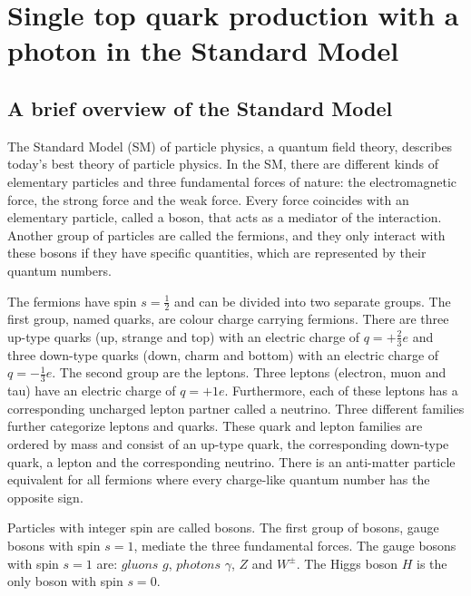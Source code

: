 
\chapter{Single top quark production with a photon in the Standard Model}
\label{chap:tqgamma_production}
\section{A brief overview of the Standard Model}

The Standard Model (SM) of particle physics, a quantum field theory,  describes today's best theory of particle physics. 
In the SM, there are different kinds of elementary particles and three fundamental forces of nature: the electromagnetic force, the strong force and the weak force. 
Every force coincides with an elementary particle, called a boson, that acts as a mediator of the interaction. Another group of particles are called the fermions, and they only interact with these bosons if they have specific quantities, which are represented by their quantum numbers.

The fermions have spin $s = \frac{1}{2}$ and can be divided into two separate groups. The first group, named quarks, are colour charge carrying fermions. 
There are three up-type quarks (up, strange and top) with an electric charge of $q = +\frac{2}{3}e$ and three down-type quarks (down, charm and bottom) with an electric charge of $q = -\frac{1}{3}e$. 
The second group are the leptons. Three leptons (electron, muon and tau) have an electric charge of $q = +1e$. Furthermore, each of these leptons has a corresponding uncharged lepton partner called a neutrino.
Three different families further categorize leptons and quarks. These quark and lepton families are ordered by mass and consist of an up-type quark, the corresponding down-type quark, a lepton and the corresponding neutrino. 
There is an anti-matter particle equivalent for all fermions where every charge-like quantum number has the opposite sign. 

Particles with integer spin are called bosons. The first group of bosons, gauge bosons with spin $s = 1$, mediate the three fundamental forces. The gauge bosons with spin $s = 1$ are: $gluons$ $g$, $photons$ $\gamma$, $Z$ and $W^{\pm}$. The Higgs boson $H$ is the only boson with spin $s=0$.


